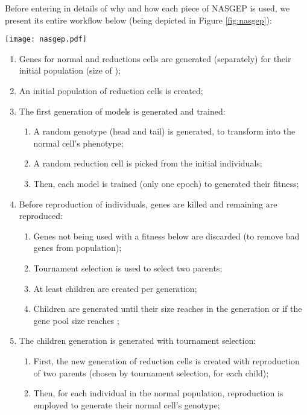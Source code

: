 \documentclass[conference]{IEEEtran}
\begin{document}
	Before entering in details of why and how each piece of NASGEP is used, we present its entire workflow below (being depicted in Figure \ref{fig:nasgep}):
	
	\begin{figure*}[hbt]
		\centering
		\texttt{[image: nasgep.pdf]}
		\caption{Overall representation of the NASGEP workflow.}
		\label{fig:nasgep}
	\end{figure*}
	
	\begin{enumerate}
		\item Genes for normal and reductions cells are generated (separately) for their initial population (size of );
		\item An initial population of  reduction cells is created;
		\item The first generation of  models is generated and trained:
		\begin{enumerate}
			\item A random genotype (head and tail) is generated, to transform into the normal cell's phenotype;
			\item A random reduction cell is picked from the initial  individuals;
			\item Then, each model is trained (only one epoch) to generated their fitness;
		\end{enumerate}
		\item Before reproduction of individuals, genes are killed and remaining are reproduced:
		\begin{enumerate}
			\item Genes not being used with a fitness below  are discarded (to remove bad genes from population);
			\item Tournament selection is used to select two parents;
			\item At least  children are created per generation;
			\item Children are generated until their size reaches  in the generation or if the gene pool size reaches ;
		\end{enumerate}
		\item The children generation is generated with tournament selection:
		\begin{enumerate}
			\item First, the new generation of reduction cells is created with reproduction of two parents (chosen by tournament selection, for each child);
			\item Then, for each individual in the normal population, reproduction is employed to generate their normal cell's genotype;

\end{enumerate}
\end{enumerate}
\end{document}
